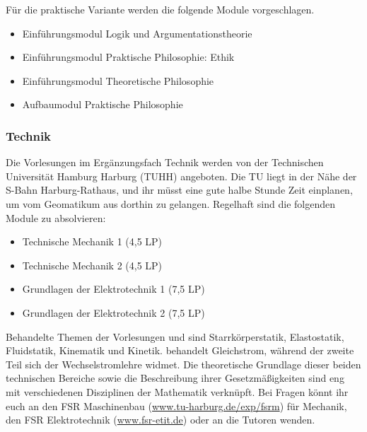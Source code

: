 \columnbreak

Für die praktische Variante werden die folgende Module vorgeschlagen.

\begin{itemize}\itemsep 0pt
    \item Einführungsmodul Logik und Argumentationstheorie 
    \item Einführungsmodul Praktische Philosophie: Ethik 
    \item Einführungsmodul Theoretische Philosophie 
    \item Aufbaumodul Praktische Philosophie
\end{itemize}

\subsubsection{Technik}

Die Vorlesungen im Ergänzungsfach Technik werden von der Technischen
Universität Hamburg Harburg (TUHH) angeboten. Die TU liegt in der Nähe der
S-Bahn Harburg-Rathaus, und ihr müsst eine gute halbe Stunde Zeit einplanen, um
vom Geomatikum aus dorthin zu gelangen. Regelhaft sind die folgenden Module zu
absolvieren:

\begin{itemize}\itemsep 0pt
    \item Technische Mechanik 1 (4,5 LP)
    \item Technische Mechanik 2 (4,5 LP)
    \item Grundlagen der Elektrotechnik 1 (7,5 LP)
    \item Grundlagen der Elektrotechnik 2 (7,5 LP)
\end{itemize}

Behandelte Themen der Vorlesungen  und 
sind Starrkörperstatik, Elastostatik, Fluidstatik, Kinematik und Kinetik.
 behandelt Gleichstrom, während der
zweite Teil sich der Wechselstromlehre widmet. Die theoretische Grundlage
dieser beiden technischen Bereiche sowie die Beschreibung ihrer
Gesetzmäßigkeiten sind eng mit verschiedenen Disziplinen der Mathematik
verknüpft. Bei Fragen könnt ihr euch an den FSR Maschinenbau
(\url{www.tu-harburg.de/exp/fsrm}) für Mechanik, den FSR Elektrotechnik
(\url{www.fsr-etit.de}) oder an die Tutoren wenden.

